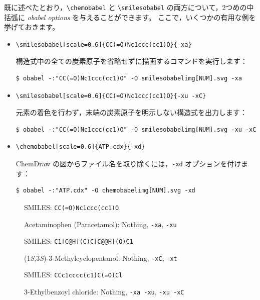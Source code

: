 \documentclass[12pt]{jsarticle}
\begin{document}
既に述べたとおり，\verb|\chemobabel| と \verb|\smilesobabel| の両方について，2つめの中括弧に \textit{obabel options} を与えることができます。
ここで，いくつかの有用な例を挙げておきます。
\begin{itemize}
\item
\begin{verbatim}
\smilesobabel[scale=0.6]{CC(=O)Nc1ccc(cc1)O}{-xa}
\end{verbatim}
構造式中の全ての炭素原子を省略せずに描画するコマンドを実行します：
\begin{verbatim}
$ obabel -:"CC(=O)Nc1ccc(cc1)O" -O smilesobabelimg[NUM].svg -xa
\end{verbatim}
\item
\begin{verbatim}
\smilesobabel[scale=0.6]{CC(=O)Nc1ccc(cc1)O}{-xu -xC}
\end{verbatim}
元素の着色を行わず，末端の炭素原子を明示しない構造式を出力します：
\begin{verbatim}
$ obabel -:"CC(=O)Nc1ccc(cc1)O" -O smilesobabelimg[NUM].svg -xu -xC
\end{verbatim}
\item
\begin{verbatim}
\chemobabel[scale=0.6]{ATP.cdx}{-xd}
\end{verbatim}
ChemDraw の図からファイル名を取り除くには，\texttt{-xd} オプションを付けます：
\begin{verbatim}
$ obabel -:"ATP.cdx" -O chemobabelimg[NUM].svg -xd
\end{verbatim}
\end{itemize}

\begin{figure}[ht]
  \centering
  \caption{Acetaminophen (Paracetamol): Nothing, \texttt{-xa}, \texttt{-xu}}
  SMILES: \verb|CC(=O)Nc1ccc(cc1)O|
\end{figure}

\begin{figure}[ht]
  \centering
  \caption{(1\textit{S},3\textit{S})-3-Methylcyclopentanol: Nothing, \texttt{-xC}, \texttt{-xt}}
  SMILES: \verb|C1[C@H](C)C[C@@H](O)C1|
\end{figure}

\begin{figure}[ht]
  \centering
  \caption{3-Ethylbenzoyl chloride: Nothing, \texttt{-xa -xu}, \texttt{-xu -xC}}
  SMILES: \verb|CCc1cccc(c1)C(=O)Cl|
\end{figure}
\end{document}
